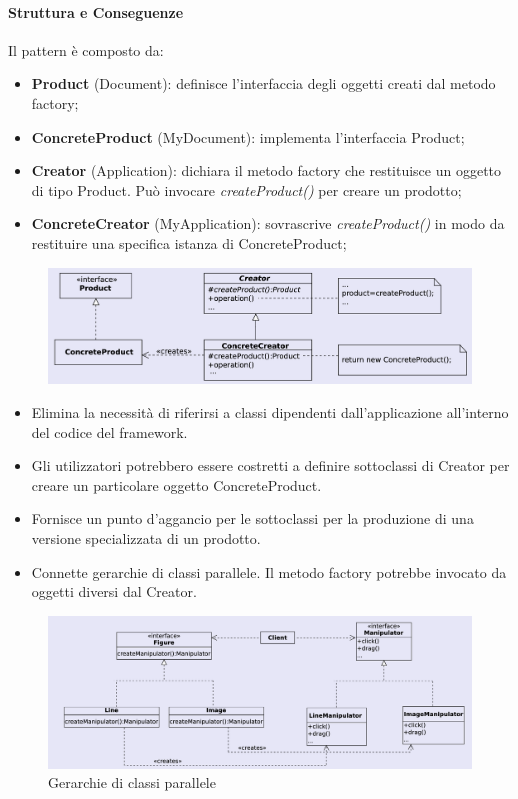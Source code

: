 \paragraph{Struttura e Conseguenze} Il pattern è composto da:
\begin{itemize}
    \item \textbf{Product} (Document): definisce l'interfaccia degli oggetti creati dal metodo factory;
    \item \textbf{ConcreteProduct} (MyDocument): implementa l'interfaccia Product;
    \item \textbf{Creator} (Application): dichiara il metodo factory che restituisce un oggetto di tipo Product. Può invocare \textit{createProduct()} per creare un prodotto;
    \item \textbf{ConcreteCreator} (MyApplication): sovrascrive \textit{createProduct()} in modo da restituire una specifica istanza di ConcreteProduct;
\end{itemize}


\begin{figure}[H]
    \centering
    \includegraphics[width=1\linewidth]{assets/pattern/factory-method/factory-method-struttura.png}
\end{figure}

\begin{itemize}
    \item Elimina la necessità di riferirsi a classi dipendenti dall’applicazione all’interno del codice del framework.
    \item Gli utilizzatori potrebbero essere costretti a definire sottoclassi di Creator per creare un particolare oggetto ConcreteProduct.
    \item Fornisce un punto d’aggancio per le sottoclassi per la produzione di una versione specializzata di un prodotto.
    \item Connette gerarchie di classi parallele. Il metodo factory potrebbe invocato da oggetti diversi dal Creator.
\end{itemize}

\begin{figure}[H]
    \centering
    \includegraphics[width=0.8\linewidth]{assets/pattern/factory-method/factory-method-parallelo.png}
    \caption{Gerarchie di classi parallele}
\end{figure}


